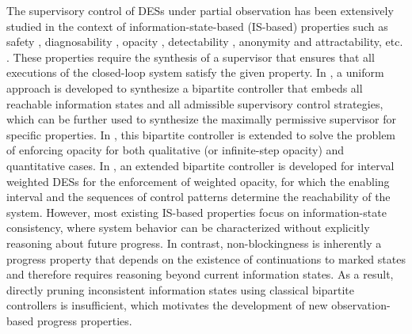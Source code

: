 \documentclass[journal,twoside,web]{ieeecolor}
\begin{document}
The supervisory control of DESs under partial observation has been extensively studied in the context of information-state-based (IS-based) properties such as safety \cite{ma2022resilient}, diagnosability \cite{li2025supervisory, hu2023asynchronous}, opacity \cite{lafortune2018history, zheng2026enforcement},
detectability \cite{shu2013enforcing}, anonymity and attractability, etc. \cite{yin2024formal, basile2022supervisory}.
These properties require the synthesis of a supervisor that ensures that all executions of the closed-loop system satisfy the given property.
%
In \cite{yin2016uniform}, a uniform approach is developed to synthesize a bipartite controller that embeds all reachable information states and all admissible supervisory control strategies, which can be further used to synthesize the maximally permissive supervisor for specific properties.
In \cite{xie2023optimal}, this bipartite controller is extended to solve the problem of enforcing opacity for both qualitative (or infinite-step opacity) and quantitative cases.
In \cite{zheng2026enforcement}, an extended bipartite controller is developed for interval weighted DESs for the enforcement of weighted opacity, for which the enabling interval and the sequences of control patterns determine the reachability of the system.
%
However, most existing IS-based properties focus on information-state consistency, where system behavior can be characterized without explicitly reasoning about future progress. 
In contrast, non-blockingness is inherently a progress property that depends on the existence of continuations to marked states and therefore requires reasoning beyond current information states. 
As a result, directly pruning inconsistent information states using classical bipartite controllers is insufficient, which motivates the development of new observation-based progress properties.
\end{document}

